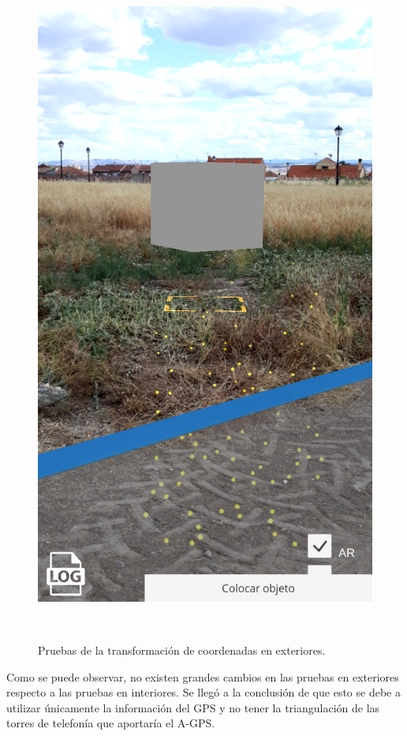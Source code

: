 \begin{figure}[H]
\begin{minipage}{0.5\textwidth}
    \end{minipage}
    \begin{minipage}{0.5\textwidth}
        \centering
        \includegraphics[scale=0.25]{Images/PruebasMapbox/mapboxGPS (4).png}\\
    \end{minipage}\\
    \caption{Pruebas de la transformación de coordenadas en exteriores.}
    \label{fig:mapboxexteriores}
\end{figure}

Como se puede observar, no existen grandes cambios en las pruebas en exteriores respecto a las pruebas en interiores. Se llegó a la conclusión de que esto se debe a utilizar únicamente la información del GPS y no tener la triangulación de las torres de telefonía que aportaría el A-GPS.

 












